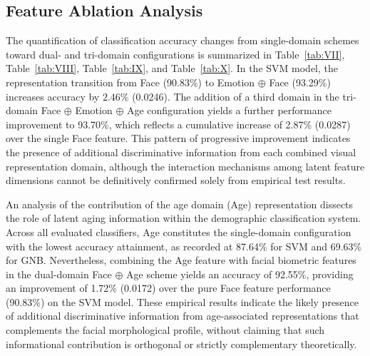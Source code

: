 \subsection{Feature Ablation Analysis}
\label{sec:feature_ablation}

The quantification of classification accuracy changes from single-domain schemes toward dual- and tri-domain configurations is summarized in Table~\ref{tab:VII}, Table~\ref{tab:VIII}, Table~\ref{tab:IX}, and Table~\ref{tab:X}. In the SVM model, the representation transition from Face (90.83\%) to Emotion $\oplus$ Face (93.29\%) increases accuracy by 2.46\% (0.0246). The addition of a third domain in the tri-domain Face $\oplus$ Emotion $\oplus$ Age configuration yields a further performance improvement to 93.70\%, which reflects a cumulative increase of 2.87\% (0.0287) over the single Face feature. This pattern of progressive improvement indicates the presence of additional discriminative information from each combined visual representation domain, although the interaction mechanisms among latent feature dimensions cannot be definitively confirmed solely from empirical test results.

An analysis of the contribution of the age domain (Age) representation dissects the role of latent aging information within the demographic classification system. Across all evaluated classifiers, Age constitutes the single-domain configuration with the lowest accuracy attainment, as recorded at 87.64\% for SVM and 69.63\% for GNB. Nevertheless, combining the Age feature with facial biometric features in the dual-domain Face $\oplus$ Age scheme yields an accuracy of 92.55\%, providing an improvement of 1.72\% (0.0172) over the pure Face feature performance (90.83\%) on the SVM model. These empirical results indicate the likely presence of additional discriminative information from age-associated representations that complements the facial morphological profile, without claiming that such informational contribution is orthogonal or strictly complementary theoretically.
